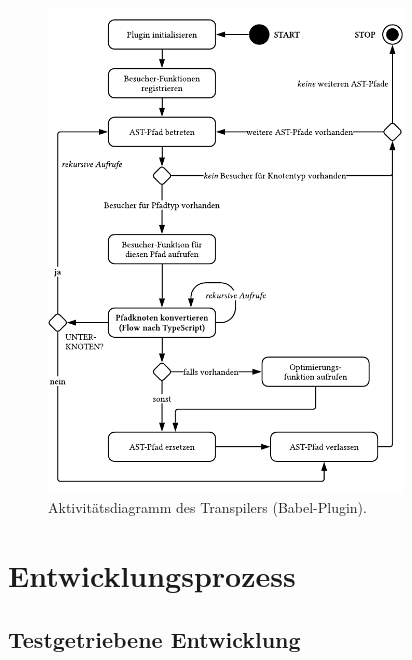 \begin{figure}[p]
  \centering
  \includegraphics[width=0.84\textwidth]{src/4_Umsetzung/img/activity-diagram-transpiler.pdf}
  \captionsetup{justification=centering}
  \caption{Aktivitätsdiagramm des Transpilers (Babel-Plugin).}
  \label{fig:activity-diagram-transpiler}
\end{figure}

\section{Entwicklungsprozess}

\subsection{Testgetriebene Entwicklung}

